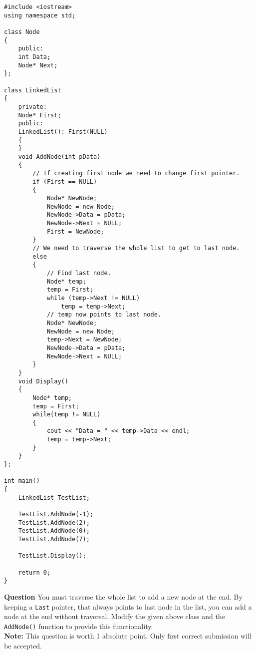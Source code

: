 \documentclass[12pt,a4paper]{article}
\begin{document}
\begin{lstlisting}[caption={Creating a Linked List}]
#include <iostream>
using namespace std;

class Node
{
	public:
	int Data;
	Node* Next;
};

class LinkedList
{
	private:
	Node* First;
	public:
	LinkedList(): First(NULL)
	{
	}
	void AddNode(int pData)
	{
		// If creating first node we need to change first pointer.
		if (First == NULL)
		{
			Node* NewNode;
			NewNode = new Node;
			NewNode->Data = pData;
			NewNode->Next = NULL;
			First = NewNode;
		}
		// We need to traverse the whole list to get to last node.
		else
		{
			// Find last node.
			Node* temp;
			temp = First;
			while (temp->Next != NULL)
				temp = temp->Next;
			// temp now points to last node.
			Node* NewNode;
			NewNode = new Node;
			temp->Next = NewNode;
			NewNode->Data = pData;
			NewNode->Next = NULL;
		}
	}
	void Display()
	{
		Node* temp;
		temp = First;
		while(temp != NULL)
		{
			cout << "Data = " << temp->Data << endl;
			temp = temp->Next;
		}
	}			
};

int main()
{
	LinkedList TestList;

	TestList.AddNode(-1);
	TestList.AddNode(2);
	TestList.AddNode(0);
	TestList.AddNode(7);
	
	TestList.Display();
	
	return 0;
}
\end{lstlisting}
\textbf{Question} You must traverse the whole list to add a new node at the end. By keeping a \verb|Last| pointer, that always points to last node in the list, you can add a node at the end without traversal. Modify the given above class and the \verb|AddNode()| function to provide this functionality.\\
\textbf{Note: } This question is worth 1 absolute point. Only first correct submission will be accepted.
%
%
\end{document}
